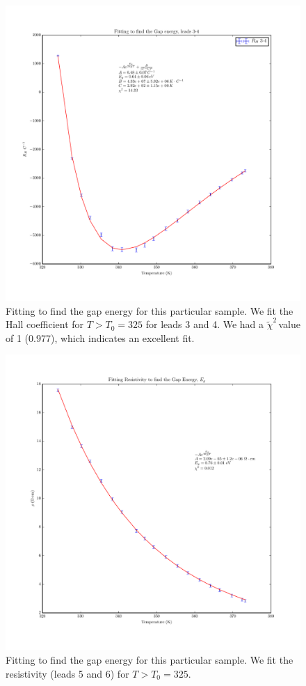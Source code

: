 \documentclass[reprint, nobibnotes, amssymb, amsmath, amsfonts, physics, mathtools, mathrsfs, floatfix]{revtex4-1}
\newcommand{\redchi}{$\tilde{\chi}^2\,$}
\begin{document}
\begin{widetext}
      \begin{figure}[h]
        \centering
        \includegraphics[width=\linewidth]{../plots/rh_34_eg.pdf}
        \caption{Fitting to find the gap energy for this particular sample.  We fit the Hall coefficient for $T > T_0 = 325$ for leads 3 and 4.  We had a \redchi value of 1 (0.977), which indicates an excellent fit. \label{rh_34_eg}}
      \end{figure}

      \begin{figure}[h]
        \centering
        \includegraphics[width=\linewidth]{../plots/resistivity_eg.pdf}
        \caption{Fitting to find the gap energy for this particular sample.  We fit the resistivity (leads 5 and 6) for $T > T_0 = 325$. \label{rho_eg}}
      \end{figure}

    \end{widetext}

  
  
\end{document}
